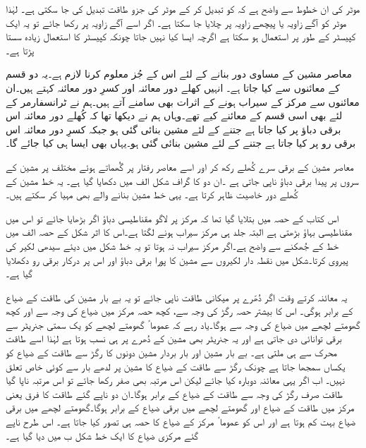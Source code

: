 موٹر کی ان خطوط سے واضح ہے کہ  کو تبدیل کر کے موٹر کی جزو طاقت تبدیل کی جا سکتی ہے۔ لہٰذا موٹر کو آگے زاویہ یا پیچھے زاویہ  پر چلایا جا سکتا ہے۔ اگر اسے آگے زاویہ پر رکھا جائے تو یہ ایک کپیسٹر  کے طور پر استعمال ہو سکتا ہے اگرچہ ایسا کیا نہیں جاتا چونکہ کپیسٹر کا استعمال زیادہ سستا پڑتا ہے۔ 

معاصر مشین کے مساوی دور بنانے کے لئے اس کے جُز معلوم کرنا لازم ہے۔یہ دو قسم کے معائنوں سے کیا جاتا ہے۔ انہیں کھلے دور معائنہ اور کسرِ دور معائنہ کہتے ہیں۔ان معائنوں سے مرکز کے سیراب ہونے کے اثرات بھی سامنے آتے ہیں۔ہم نے ٹرانسفارمر کے لئے بھی اسی قسم کے معائنے کیے تھے۔وہاں ہم نے دیکھا تھا کہ کُھلے دور معائنہ اس برقی دباؤ پر کیا جاتا ہے جتنے کے لئے مشین بنائی گئی ہو جبکہ کسرِ دور معائنہ اس برقی رو پر کیا جاتا ہے جتنے کے لئے مشین بنائی گئی ہو۔یہاں بھی ایسا ہی کیا جائے گا۔ 

معاصر مشین کے برقی سرے کُھلے رکھ کر اور اسے معاصر رفتار پر گُھماتے ہوئے مختلف  پر  مشین کے سروں پر پیدا برقی دباؤ  ناپی جاتی ہے ۔ان دو کا گراف شکل  الف میں دکھایا گیا ہے۔ یہ خط مشین کے کُھلے دور خاصیت ظاہر کرتا ہے۔ یہی خط مشین بنانے والے بھی مہیا کر سکتے ہیں۔

اس کتاب کے حصہ میں بتلایا گیا تھا کہ مرکز پر لاگو مقناطیسی دباؤ اگر بڑھایا جائے تو اس میں مقناطیسی بہاؤ بڑھتی ہے البتہ جلد ہی مرکز سیراب ہونے لگتا ہے۔اس کا اثر شکل کے حصہ الف میں خط کے جُھکنے سے واضح ہے۔اگر مرکز سیراب نہ ہوتا تو یہ خط شکل میں دیئے سیدھی لکیر کی پیروی کرتا۔شکل میں نقطہ دار لکیروں سے مشین کا پورا برقی دباؤ اور اس  پر درکار برقی رو  دکھلایا گیا ہے۔

یہ معائنہ کرتے وقت اگر دُھّرے پر میکانی طاقت  ناپی جائے تو یہ بے بار مشین کی طاقت کے ضیاع کے برابر ہوگی۔ اس کا بیشتر حصہ رگڑ کی وجہ سے، کچھ حصہ مرکز میں ضیاع کی وجہ سے اور کچھ گھومتے لچھے میں ضیاع کی وجہ سے ہوگا۔یاد رہے کہ عموما ً گھومتے لچھے کو یک سمتی جنریٹر سے برقی توانائی دی جاتی ہے اور یہ جنریٹر بھی مشین کے دُھرے پر ہی نسب ہوتا ہے لہٰذا اسے طاقت محرک سے ہی ملتی ہے۔ بے بار مشین اور بار بردار مشین دونوں کا رگڑ سے طاقت کے ضیاع کو یکساں سمجھا جاتا ہے چونک رگڑ سے طاقت کے ضیاع کا مشین پر لدھے بار سے کوئی خاص تعلق نہیں۔ اب اگر یہی معائنہ دوبارہ کیا جائے لیکن اس مرتبہ  بھی صفر رکھا جائے تو اس مرتبہ ناپا گیا طاقت  صرف رگڑ کی وجہ سے طاقت کے ضیاع کے برابر ہوگا۔ان دو ناپے گئے طاقت کا فرق یعنی  مرکز میں طاقت کے ضیاع  اور گھومتے لچھے میں برقی ضیاع کے برابر ہوگا۔گھومتے لچھے میں برقی ضیاع بہت کم ہوتا ہے اور اس کو عموما ً مرکز کے ضیاع کا حصہ ہی تصور کیا جاتا ہے۔ اس طرح ناپے گئے مرکزی ضیاع کا ایک خط شکل  ب میں دیا گیا ہے۔

